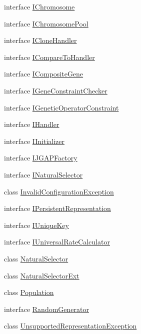 \begin{DoxyCompactItemize}
interface \hyperlink{interfaceorg_1_1jgap_1_1_i_chromosome}{I\-Chromosome}
\item 
interface \hyperlink{interfaceorg_1_1jgap_1_1_i_chromosome_pool}{I\-Chromosome\-Pool}
\item 
interface \hyperlink{interfaceorg_1_1jgap_1_1_i_clone_handler}{I\-Clone\-Handler}
\item 
interface \hyperlink{interfaceorg_1_1jgap_1_1_i_compare_to_handler}{I\-Compare\-To\-Handler}
\item 
interface \hyperlink{interfaceorg_1_1jgap_1_1_i_composite_gene}{I\-Composite\-Gene}
\item 
interface \hyperlink{interfaceorg_1_1jgap_1_1_i_gene_constraint_checker}{I\-Gene\-Constraint\-Checker}
\item 
interface \hyperlink{interfaceorg_1_1jgap_1_1_i_genetic_operator_constraint}{I\-Genetic\-Operator\-Constraint}
\item 
interface \hyperlink{interfaceorg_1_1jgap_1_1_i_handler}{I\-Handler}
\item 
interface \hyperlink{interfaceorg_1_1jgap_1_1_i_initializer}{I\-Initializer}
\item 
interface \hyperlink{interfaceorg_1_1jgap_1_1_i_j_g_a_p_factory}{I\-J\-G\-A\-P\-Factory}
\item 
interface \hyperlink{interfaceorg_1_1jgap_1_1_i_natural_selector}{I\-Natural\-Selector}
\item 
class \hyperlink{classorg_1_1jgap_1_1_invalid_configuration_exception}{Invalid\-Configuration\-Exception}
\item 
interface \hyperlink{interfaceorg_1_1jgap_1_1_i_persistent_representation}{I\-Persistent\-Representation}
\item 
interface \hyperlink{interfaceorg_1_1jgap_1_1_i_unique_key}{I\-Unique\-Key}
\item 
interface \hyperlink{interfaceorg_1_1jgap_1_1_i_universal_rate_calculator}{I\-Universal\-Rate\-Calculator}
\item 
class \hyperlink{classorg_1_1jgap_1_1_natural_selector}{Natural\-Selector}
\item 
class \hyperlink{classorg_1_1jgap_1_1_natural_selector_ext}{Natural\-Selector\-Ext}
\item 
class \hyperlink{classorg_1_1jgap_1_1_population}{Population}
\item 
interface \hyperlink{interfaceorg_1_1jgap_1_1_random_generator}{Random\-Generator}
\item 
class \hyperlink{classorg_1_1jgap_1_1_unsupported_representation_exception}{Unsupported\-Representation\-Exception}

\end{DoxyCompactItemize}

